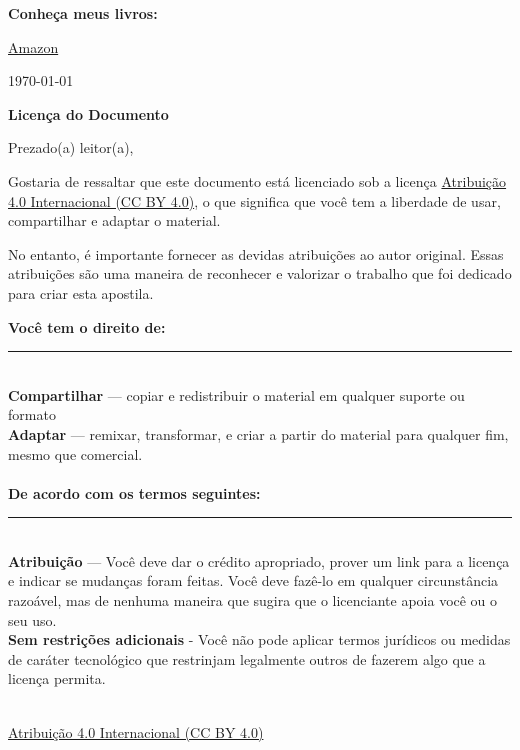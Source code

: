 \noindent \textbf{Conheça meus livros:}

\noindent \faAmazon{} \href{https://www.amazon.com.br/Erick-Faria/e/B09SZPGBZL/}{Amazon} \\

\vfill

\centerline{{\noindent \today}}

\newpage

\begin{center}
\Huge\textbf{Licença do Documento}
\end{center}

Prezado(a) leitor(a),

Gostaria de ressaltar que este documento está licenciado sob a licença \href{https://creativecommons.org/licenses/by/4.0/deed.pt_BR}{Atribuição 4.0 Internacional (CC BY 4.0)}, o que significa que você tem a liberdade de usar, compartilhar e adaptar o material. 

No entanto, é importante fornecer as devidas atribuições ao autor original. Essas atribuições são uma maneira de reconhecer e valorizar o trabalho que foi dedicado para criar esta apostila.

\vfill
\small{\noindent \textbf{Você tem o direito de:}} \vspace{-3mm}\\
\noindent \rule{3.3cm}{0.5pt} \\
\textbf{Compartilhar } — copiar e redistribuir o material em qualquer suporte ou formato \\
\textbf{Adaptar} — remixar, transformar, e criar a partir do material para qualquer fim, mesmo que comercial. \\
\\
\small{\noindent \textbf{De acordo com os termos seguintes:}}\vspace{-3mm}\\
\noindent \rule{3.3cm}{0.5pt} \\
\textbf{Atribuição} — Você deve dar o crédito apropriado, prover um link para a licença e indicar se mudanças foram feitas. Você deve fazê-lo em qualquer circunstância razoável, mas de nenhuma maneira que sugira que o licenciante apoia você ou o seu uso.  \\
\textbf{Sem restrições adicionais} - Você não pode aplicar termos jurídicos ou medidas de caráter tecnológico que restrinjam legalmente outros de fazerem algo que a licença permita.  \\
\vspace{10mm} \\
\centerline{\href{https://creativecommons.org/licenses/by/4.0/deed.pt_BR}{Atribuição 4.0 Internacional (CC BY 4.0)}}
\vspace{5mm}\\
\centerline{\ccby}
